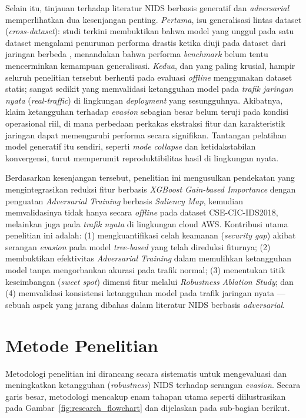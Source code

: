 \documentclass[10pt,twocolumn,a4paper]{extarticle}
\begin{document}
Selain itu, tinjauan terhadap literatur NIDS berbasis generatif dan \textit{adversarial} memperlihatkan dua kesenjangan penting. \textit{Pertama}, isu generalisasi lintas dataset (\textit{cross-dataset}): studi terkini membuktikan bahwa model yang unggul pada satu dataset mengalami penurunan performa drastis ketika diuji pada dataset dari jaringan berbeda \citep{ref_crossgen,ref_synthtraffic}, menandakan bahwa performa \textit{benchmark} belum tentu mencerminkan kemampuan generalisasi. \textit{Kedua}, dan yang paling krusial, hampir seluruh penelitian tersebut berhenti pada evaluasi \textit{offline} menggunakan dataset statis; sangat sedikit yang memvalidasi ketangguhan model pada \textit{trafik jaringan nyata} (\textit{real-traffic}) di lingkungan \textit{deployment} yang sesungguhnya. Akibatnya, klaim ketangguhan terhadap \textit{evasion} sebagian besar belum teruji pada kondisi operasional riil, di mana perbedaan perkakas ekstraksi fitur dan karakteristik jaringan dapat memengaruhi performa secara signifikan. Tantangan pelatihan model generatif itu sendiri, seperti \textit{mode collapse} dan ketidakstabilan konvergensi, turut memperumit reproduktibilitas hasil di lingkungan nyata.

Berdasarkan kesenjangan tersebut, penelitian ini mengusulkan pendekatan yang mengintegrasikan reduksi fitur berbasis \textit{XGBoost Gain-based Importance} dengan penguatan \textit{Adversarial Training} berbasis \textit{Saliency Map}, kemudian memvalidasinya tidak hanya secara \textit{offline} pada dataset CSE-CIC-IDS2018, melainkan juga pada \textit{trafik nyata} di lingkungan cloud AWS. Kontribusi utama penelitian ini adalah: (1) mengkuantifikasi celah keamanan (\textit{security gap}) akibat serangan \textit{evasion} pada model \textit{tree-based} yang telah direduksi fiturnya; (2) membuktikan efektivitas \textit{Adversarial Training} dalam memulihkan ketangguhan model tanpa mengorbankan akurasi pada trafik normal; (3) menentukan titik keseimbangan (\textit{sweet spot}) dimensi fitur melalui \textit{Robustness Ablation Study}; dan (4) memvalidasi konsistensi ketangguhan model pada trafik jaringan nyata --- sebuah aspek yang jarang dibahas dalam literatur NIDS berbasis \textit{adversarial}.

\section{Metode Penelitian}
Metodologi penelitian ini dirancang secara sistematis untuk mengevaluasi dan meningkatkan ketangguhan (\textit{robustness}) NIDS terhadap serangan \textit{evasion}. Secara garis besar, metodologi mencakup enam tahapan utama seperti diilustrasikan pada Gambar~\ref{fig:research_flowchart} dan dijelaskan pada sub-bagian berikut.
\end{document}

